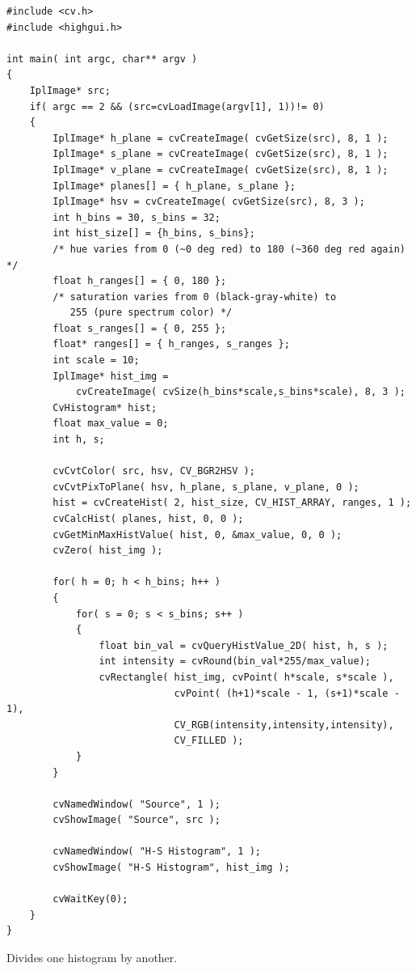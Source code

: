 \begin{lstlisting}
#include <cv.h>
#include <highgui.h>

int main( int argc, char** argv )
{
    IplImage* src;
    if( argc == 2 && (src=cvLoadImage(argv[1], 1))!= 0)
    {
        IplImage* h_plane = cvCreateImage( cvGetSize(src), 8, 1 );
        IplImage* s_plane = cvCreateImage( cvGetSize(src), 8, 1 );
        IplImage* v_plane = cvCreateImage( cvGetSize(src), 8, 1 );
        IplImage* planes[] = { h_plane, s_plane };
        IplImage* hsv = cvCreateImage( cvGetSize(src), 8, 3 );
        int h_bins = 30, s_bins = 32;
        int hist_size[] = {h_bins, s_bins};
        /* hue varies from 0 (~0 deg red) to 180 (~360 deg red again) */
        float h_ranges[] = { 0, 180 };
        /* saturation varies from 0 (black-gray-white) to
           255 (pure spectrum color) */
        float s_ranges[] = { 0, 255 };
        float* ranges[] = { h_ranges, s_ranges };
        int scale = 10;
        IplImage* hist_img =
            cvCreateImage( cvSize(h_bins*scale,s_bins*scale), 8, 3 );
        CvHistogram* hist;
        float max_value = 0;
        int h, s;

        cvCvtColor( src, hsv, CV_BGR2HSV );
        cvCvtPixToPlane( hsv, h_plane, s_plane, v_plane, 0 );
        hist = cvCreateHist( 2, hist_size, CV_HIST_ARRAY, ranges, 1 );
        cvCalcHist( planes, hist, 0, 0 );
        cvGetMinMaxHistValue( hist, 0, &max_value, 0, 0 );
        cvZero( hist_img );

        for( h = 0; h < h_bins; h++ )
        {
            for( s = 0; s < s_bins; s++ )
            {
                float bin_val = cvQueryHistValue_2D( hist, h, s );
                int intensity = cvRound(bin_val*255/max_value);
                cvRectangle( hist_img, cvPoint( h*scale, s*scale ),
                             cvPoint( (h+1)*scale - 1, (s+1)*scale - 1),
                             CV_RGB(intensity,intensity,intensity),
                             CV_FILLED );
            }
        }

        cvNamedWindow( "Source", 1 );
        cvShowImage( "Source", src );

        cvNamedWindow( "H-S Histogram", 1 );
        cvShowImage( "H-S Histogram", hist_img );

        cvWaitKey(0);
    }
}
\end{lstlisting}

Divides one histogram by another.

